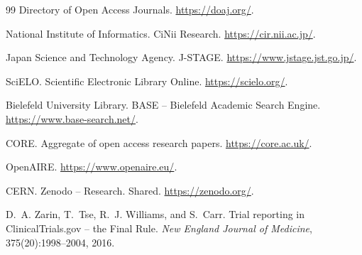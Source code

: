 \documentclass[sigconf,screen]{acmart}
\begin{document}
\begin{thebibliography}{99}
Directory of Open Access Journals.
\newblock \url{https://doaj.org/}.

National Institute of Informatics.
\newblock CiNii Research.
\newblock \url{https://cir.nii.ac.jp/}.

Japan Science and Technology Agency.
\newblock J-STAGE.
\newblock \url{https://www.jstage.jst.go.jp/}.

SciELO.
\newblock Scientific Electronic Library Online.
\newblock \url{https://scielo.org/}.

Bielefeld University Library.
\newblock BASE -- Bielefeld Academic Search Engine.
\newblock \url{https://www.base-search.net/}.

CORE.
\newblock Aggregate of open access research papers.
\newblock \url{https://core.ac.uk/}.

OpenAIRE.
\newblock \url{https://www.openaire.eu/}.

CERN.
\newblock Zenodo -- Research. Shared.
\newblock \url{https://zenodo.org/}.

D.~A. Zarin, T.~Tse, R.~J. Williams, and S.~Carr.
\newblock Trial reporting in ClinicalTrials.gov -- the Final Rule.
\newblock \emph{New England Journal of Medicine}, 375(20):1998--2004, 2016.

\end{thebibliography}
\end{document}
